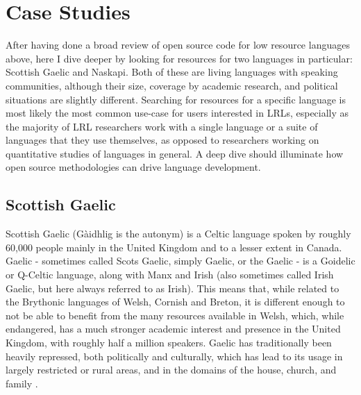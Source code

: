 \section{Case Studies}
\label{sec:case-studies}

After having done a broad review of open source code for low resource languages above, here I dive deeper by looking for resources for two languages in particular: Scottish Gaelic and Naskapi. Both of these are living languages with speaking communities, although their size, coverage by academic research, and political situations are slightly different. Searching for resources for a specific language is most likely the most common use-case for users interested in LRLs, especially as the majority of LRL researchers work with a single language or a suite of languages that they use themselves, as opposed to researchers working on quantitative studies of languages in general. A deep dive should illuminate how open source methodologies can drive language development.




\subsection{Scottish Gaelic}
\label{sec:gaelic}

Scottish Gaelic (G\`aidhlig is the autonym) is a Celtic language spoken by roughly 60,000 people mainly in the United Kingdom and to a lesser extent in Canada. Gaelic - sometimes called Scots Gaelic, simply Gaelic, or the Gaelic - is a Goidelic or Q-Celtic language, along with Manx and Irish (also sometimes called Irish Gaelic, but here always referred to as Irish). This means that, while related to the Brythonic languages of Welsh, Cornish and Breton, it is different enough to not be able to benefit from the many resources available in Welsh, which, while endangered, has a much stronger academic interest and presence in the United Kingdom, with roughly half a million speakers. Gaelic has traditionally been heavily repressed, both politically and culturally, which has lead to its usage in largely restricted or rural areas, and in the domains of the house, church, and family \citep{mackinnon1991past}.


